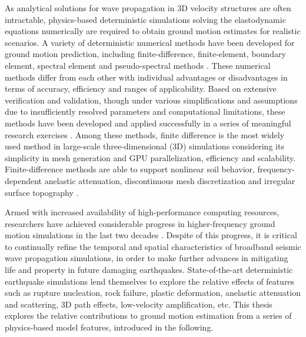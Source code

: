 As analytical solutions for wave propagation in 3D velocity structures are often intractable, physics-based deterministic simulations solving the elastodynamic equations numerically are required to obtain ground motion estimates for realistic scenarios. A variety of deterministic numerical methods have been developed for ground motion prediction, including finite-difference, finite-element, boundary element, spectral element and pseudo-spectral methods . These numerical methods differ from each other with individual advantages or disadvantages in terms of accuracy, efficiency and ranges of applicability.  Based on extensive verification and validation, though under various simplifications and assumptions due to insufficiently resolved parameters and computational limitations, these methods have been developed and applied successfully in a series of meaningful research exercises \citep[e.g., ShakeOut, PetaShake, M9 Cascadia; for more details readers are referred to ][]{cuiPetascaleEarthquakeSimulations2009,cuiTeraShakeComputationalPlatform2009,olsen2009shakeout,marafiImpactsSimulatedM92019}. Among these methods, finite difference is the most widely used method in large-scale three-dimensional (3D) simulations considering its simplicity in mesh generation and GPU parallelization, efficiency and scalability. Finite-difference methods are able to support nonlinear soil behavior, frequency-dependent anelastic attenuation, discontinuous mesh discretization and irregular surface topography .

Armed with increased availability of high-performance computing resources, researchers have achieved considerable progress in higher-frequency ground motion simulations in the last two decades \citep{gravesBroadbandSimulationsSouthern2008,olsen2009shakeout,bielakShakeOutEarthquakeScenario2010,roten3DSimulationsEarthquakes2012, savranGroundMotionSimulation2019,withersGroundMotionIntraevent2019}. Despite of this progress, it is critical to continually refine the temporal and spatial characteristics of broadband seismic wave propagation simulations, in order to make further advances in mitigating life and property in future damaging earthquakes. State-of-the-art deterministic earthquake simulations lend themselves to explore the relative effects of features such as rupture nucleation, rock failure, plastic deformation, anelastic attenuation and scattering, 3D path effects, low-velocity amplification, etc. This thesis explores the relative contributions to ground motion estimation from a series of physics-based model features, introduced in the following.


